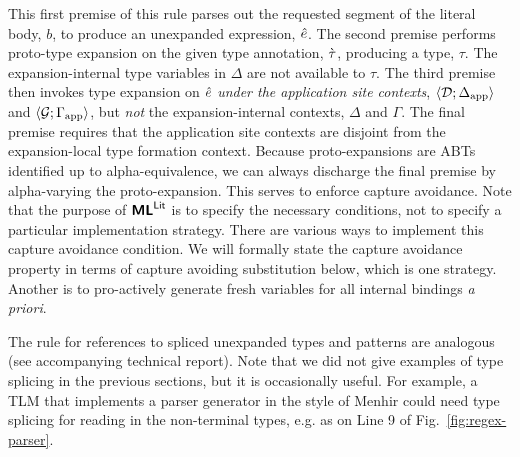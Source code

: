 \documentclass[acmsmall,screen]{acmart}
\begin{document}

\noindent
This first premise of this rule parses out the requested segment of the literal body, $b$, to produce an unexpanded expression, ${\hat e}$. The second premise performs proto-type expansion on the given type annotation, $\grave{\tau}$, producing a type, $\tau$. The expansion-internal type variables in $\Delta$ are not available to $\tau$. The third premise then invokes type expansion on ${\hat e}$ \emph{under the application site contexts}, $\langle \mathcal{D}; \Delta_\text{app} \rangle$ and $\langle \mathcal{G}; \Gamma_\text{app} \rangle$, but \emph{not} the expansion-internal contexts, $\Delta$ and $\Gamma$.  The final premise requires that the application site contexts are disjoint from the expansion-local type formation context. Because proto-expansions are ABTs identified up to alpha-equivalence, we can always discharge the final premise by alpha-varying the proto-expansion. This serves to enforce capture avoidance. Note that the purpose of $\textsf{\textbf{ML}}^\textsf{Lit}$ is to specify the necessary conditions, not to specify a particular implementation strategy. There are various ways to implement this capture avoidance condition. We will formally state the capture avoidance property in terms of capture avoiding substitution below, which is one strategy. Another is to pro-actively generate fresh variables for all internal bindings \emph{a priori}.

The rule for references to spliced unexpanded types and patterns are analogous (see accompanying technical report). Note that we did not give examples of type splicing in the previous sections, but it is occasionally useful. For example, a TLM that implements a parser generator in the style of Menhir could need type splicing for reading in the non-terminal types, e.g. as on Line 9 of Fig.~\ref{fig:regex-parser}.
\end{document}
